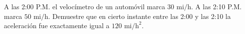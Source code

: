 \item A las 2:00 P.M. el velocímetro de un automóvil marca $30 \text{ mi/h}$. A las 2:10 P.M. marca $50 \text{ mi/h}$. Demuestre que en cierto instante entre las 2:00 y las 2:10 la aceleración fue exactamente igual a $120 \text{ mi/h}^2$.
